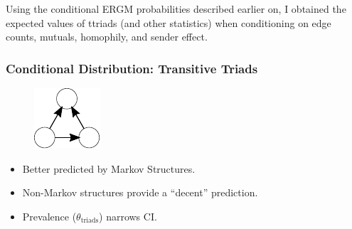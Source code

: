 \documentclass[aspectratio=169, 9pt, handout]{beamer}
\begin{document}
\begin{frame}[c]
Using the conditional ERGM probabilities described earlier on, I obtained the expected values of ttriads (and other statistics) when conditioning on edge counts, mutuals, homophily, and sender effect.
\end{frame}



\begin{frame}[c,label=conditional-transitivity]
	\frametitle{Conditional Distribution: Transitive Triads}
\begin{minipage}[b]{.28\linewidth}
	\begin{figure}
		\includegraphics[width=.3\linewidth]{ttriad.pdf}
	\end{figure}
	\begin{itemize}[<+->]
		\item Better predicted by Markov Structures.
		\item Non-Markov structures provide a ``decent'' prediction.
		\item Prevalence ($\theta_{\mbox{triads}}$) narrows CI.
	\end{itemize}
\end{minipage}
\begin{minipage}[b]{.7\linewidth}
\begin{figure}
	\centering
	\def\svgwidth{.95\linewidth}
\end{figure}
\end{minipage}
\vfill\hfill
\hyperlink{conditional-mutual}{}
\end{frame}
\end{document}
